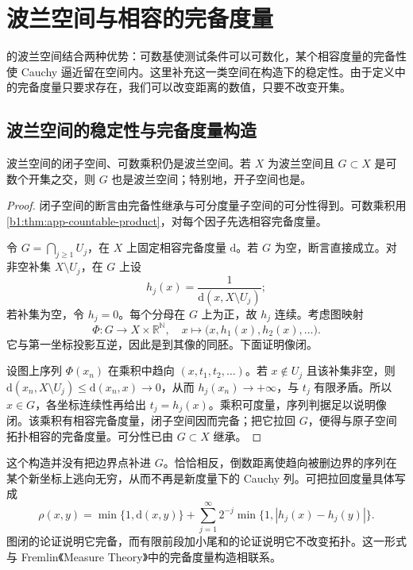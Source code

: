 \section{波兰空间与相容的完备度量}
\label{b1:sec:A105}

的波兰空间结合两种优势：可数基使测试条件可以可数化，某个相容度量的完备性使 Cauchy 逼近留在空间内。这里补充这一类空间在构造下的稳定性。由于定义中的完备度量只要求存在，我们可以改变距离的数值，只要不改变开集。

\subsection{波兰空间的稳定性与完备度量构造}
\label{b1:subsec:A10501}

\begin{proposition}\label{b1:prop:app-polish-operations}
波兰空间的闭子空间、可数乘积仍是波兰空间。若 \(X\) 为波兰空间且 \(G\subset X\) 是可数个开集之交，则 \(G\) 也是波兰空间；特别地，开子空间也是。
\end{proposition}
\begin{proof}
闭子空间的断言由完备性继承与可分度量子空间的可分性得到。可数乘积用\cref{b1:thm:app-countable-product}，对每个因子先选相容完备度量。

令 \(G=\bigcap_{j\ge1}U_j\)，在 \(X\) 上固定相容完备度量 \(\mathrm{d}\)。若 \(G\) 为空，断言直接成立。对非空补集 \(X\setminus U_j\)，在 \(G\) 上设
\[
 h_j(x)=\frac1{\mathrm{d}(x,X\setminus U_j)};
\]
若补集为空，令 \(h_j=0\)。每个分母在 \(G\) 上为正，故 \(h_j\) 连续。考虑图映射
\[
 \Phi:G\longrightarrow X\times\mathbb R^{\mathbb N},
 \quad x\longmapsto\bigl(x,h_1(x),h_2(x),\ldots\bigr).
\]
它与第一坐标投影互逆，因此是到其像的同胚。下面证明像闭。

设图上序列 \(\Phi(x_n)\) 在乘积中趋向 \((x,t_1,t_2,\ldots)\)。若 \(x\notin U_j\) 且该补集非空，则 \(\mathrm{d}(x_n,X\setminus U_j)\le \mathrm{d}(x_n,x)\rightarrow0\)，从而 \(h_j(x_n)\rightarrow+\infty\)，与 \(t_j\) 有限矛盾。所以 \(x\in G\)，各坐标连续性再给出 \(t_j=h_j(x)\)。乘积可度量，序列判据足以说明像闭。该乘积有相容完备度量，闭子空间因而完备；把它拉回 \(G\)，便得与原子空间拓扑相容的完备度量。可分性已由 \(G\subset X\) 继承。
\end{proof}

这个构造并没有把边界点补进 \(G\)。恰恰相反，倒数距离使趋向被删边界的序列在某个新坐标上逃向无穷，从而不再是新度量下的 Cauchy 列。可把拉回度量具体写成
\[
 \rho(x,y)=\min\{1,\mathrm{d}(x,y)\}
 +\sum_{j=1}^{\infty}2^{-j}\min\{1,|h_j(x)-h_j(y)|\}.
\]
图闭的论证说明它完备，而有限前段加小尾和的论证说明它不改变拓扑。这一形式与 Fremlin《Measure Theory》\cite[Appendix to Volume 4, 4A2M and 4A2Q]{Fremlin2016Measure}中的完备度量构造相联系。

